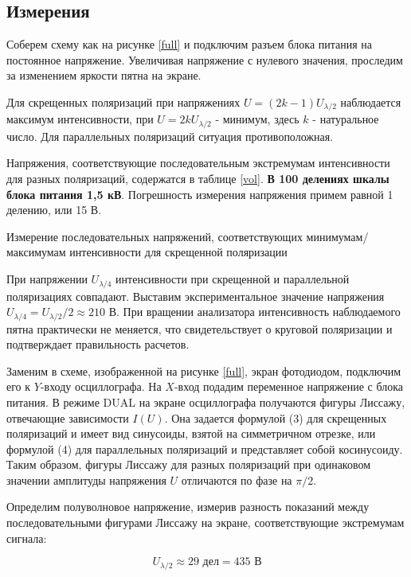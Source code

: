     \subsection{Измерения}
	
	Соберем схему как на рисунке \ref{full} и подключим разъем блока питания на постоянное напряжение. Увеличивая напряжение с нулевого значения, проследим за изменением яркости пятна на экране. 
	
	Для скрещенных поляризаций при напряжениях $U = (2k - 1)U_{\lambda/2}$ наблюдается максимум интенсивности, при $U = 2kU_{\lambda/2}$ - минимум, здесь $k$ - натуральное число. Для параллельных поляризаций ситуация противоположная. 
	
	Напряжения, соответствующие последовательным экстремумам интенсивности для разных поляризаций, содержатся в таблице \ref{vol}.\textbf{	В 100 делениях шкалы блока питания 1,5 кВ}. Погрешность измерения напряжения примем равной 1 делению, или 15 В. 
	
	\begin{table}[h]
		\centering
		
		\caption{Измерение последовательных напряжений, соответствующих минимумам/максимумам интенсивности для скрещенной поляризации}
		\label{vol}
	\end{table}	
	
	При напряжении $U_{\lambda/4}$ интенсивности при скрещенной и параллельной поляризациях совпадают. Выставим экспериментальное значение напряжения $U_{\lambda/4} = U_{\lambda/2}/2 \approx 210$ В. При вращении анализатора интенсивность наблюдаемого пятна практически не меняется, что свидетельствует о круговой поляризации и подтверждает правильность расчетов.  
	
	Заменим в схеме, изображенной на рисунке \ref{full}, экран фотодиодом, подключим его к $Y$-входу осциллографа. На $X$-вход подадим переменное напряжение с блока питания. В режиме DUAL на экране осциллографа получаются фигуры Лиссажу, отвечающие зависимости $I(U)$. Она задается формулой (3) для скрещенных поляризаций и имеет вид синусоиды, взятой на симметричном отрезке, или формулой (4) для параллельных поляризаций и представляет собой косинусоиду. Таким образом, фигуры Лиссажу для разных поляризаций при одинаковом значении амплитуды напряжения $U$ отличаются по фазе на $\pi/2$.
	
	Определим полуволновое напряжение, измерив разность показаний между последовательными фигурами Лиссажу на экране, соответствующие экстремумам сигнала: 
	
	\[ U_{\lambda/2} \approx 29 \text{ дел} = 435 \text{ В} \]
	
